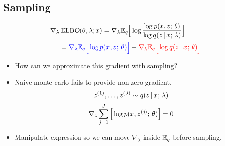 




\subsection{Sampling}


\begin{frame}
\begin{align*}
    \nabla_\lambda &\operatorname*{ELBO}(\theta, \lambda ; x) =  \nabla_\lambda \mathbb{E}_q \Big[\log \frac{\log p(x, z ; \, \theta)}{\log q (z \,|\, x ; \, \lambda)} \Big]\\
    &= {\color{blue} \nabla_\lambda {\mathbb{E}_{ q}\Big[ \log p(x^{}, z^{} ; \,\theta) \Big]}} - {\color{red} \nabla_\lambda \mathbb{E}_{ q}\Big[ \log q( z^{} \,|\, x^{} ; \, \theta) \Big]}  
\end{align*} 
\pause
\begin{itemize}
    \item How can we approximate this gradient with sampling?
    \item Naive monte-carlo fails to provide non-zero gradient.
    \[ z^{(1)}, \dots, z^{(J)} \sim q(z \,|\, x^{} ; \, \lambda) \]
 \[ \nabla_\lambda \sum_{j=1}^J \Big[ \log p(x^{}, z^{(j)} ; \, \theta) \Big] = 0\]
    \item Manipulate expression so we can move $\nabla_\lambda$ inside $\mathbb{E}_q$ before sampling.
\end{itemize}
\end{frame}


